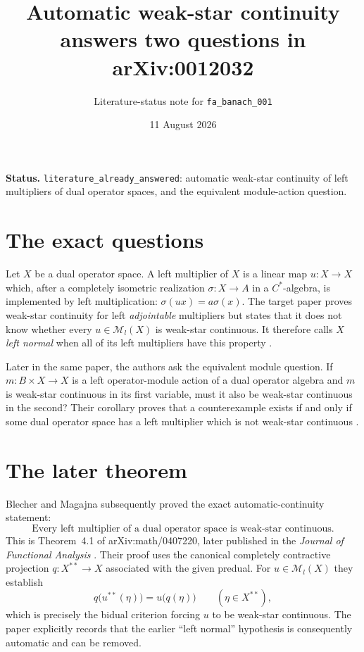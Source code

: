 \documentclass[11pt]{article}
\title{Automatic weak-star continuity answers two questions in arXiv:0012032}
\author{Literature-status note for \texttt{fa\_banach\_001}}
\date{11 August 2026}
\begin{document}
\maketitle

\noindent\textbf{Status.}
\texttt{literature\_already\_answered}: automatic weak-star continuity of
left multipliers of dual operator spaces, and the equivalent module-action
question.

\section*{The exact questions}

Let $X$ be a dual operator space.  A left multiplier of $X$ is a linear map
$u:X\to X$ which, after a completely isometric realization
$\sigma:X\to A$ in a $C^*$-algebra, is implemented by left multiplication:
$\sigma(u x)=a\sigma(x)$.  The target paper proves weak-star continuity for
left \emph{adjointable} multipliers but states that it does not know whether
every $u\in\mathcal M_l(X)$ is weak-star continuous.  It therefore calls
$X$ \emph{left normal} when all of its left multipliers have this property
\cite{BM01}.

Later in the same paper, the authors ask the equivalent module question.  If
$m:B\times X\to X$ is a left operator-module action of a dual operator
algebra and $m$ is weak-star continuous in its first variable, must it also
be weak-star continuous in the second?  Their corollary proves that a
counterexample exists if and only if some dual operator space has a left
multiplier which is not weak-star continuous \cite{BM01}.

\section*{The later theorem}

Blecher and Magajna subsequently proved the exact automatic-continuity
statement:
\[
 \boxed{\text{Every left multiplier of a dual operator space is
 weak-star continuous.}}
\]
This is Theorem~4.1 of arXiv:math/0407220, later published in the
\emph{Journal of Functional Analysis} \cite{BM05}.  Their proof uses the
canonical completely contractive projection $q:X^{**}\to X$ associated
with the given predual.  For $u\in\mathcal M_l(X)$ they establish
\[
 q\bigl(u^{**}(\eta)\bigr)=u\bigl(q(\eta)\bigr)
 \qquad(\eta\in X^{**}),
\]
which is precisely the bidual criterion forcing $u$ to be weak-star
continuous.  The paper explicitly records that the earlier ``left normal''
hypothesis is consequently automatic and can be removed.
\end{document}
